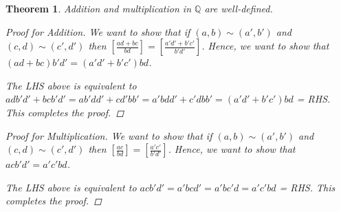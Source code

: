 \documentclass[11pt]{article}
\newcommand{\bbQ}{\mathbb{Q}}
\renewcommand{\_}[1]{\underline{ #1 }}
\newtheorem{theorem}{Theorem}[section]
\theoremstyle{definition}
\numberwithin{equation}{subsection}
\begin{document}
\begin{theorem}
Addition and multiplication in $\bbQ$ are well-defined.  
\begin{proof}[Proof for Addition]
We want to show that if $(a,b) \sim (a',b')$ and $(c,d) \sim (c',d')$ then $[\frac{ad+bc}{bd}] = [\frac{a'd'+b'c'}{b'd'}]$. Hence, we want to show that $(ad+bc)b'd' = (a'd'+b'c')bd$.

The LHS above is equivalent to $adb'd' + bcb'd' = ab'dd' + cd'bb' = a'bdd' + c'dbb' = (a'd'+b'c')bd$ = RHS. This completes the proof.


\renewcommand\qedsymbol{QED}
\end{proof}

\begin{proof}[Proof for Multiplication]
We want to show that if $(a,b) \sim (a',b')$ and $(c,d) \sim (c',d')$ then $[\frac{ac}{bd}] = [\frac{a'c'}{b'd'}]$. Hence, we want to show that $acb'd' = a'c'bd$.

The LHS above is equivalent to $acb'd' = a'bcd' = a'bc'd = a'c'bd$ = RHS. This completes the proof.


\renewcommand\qedsymbol{QED}
\end{proof}

\end{theorem}
\end{document}
